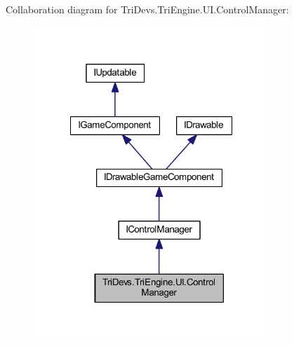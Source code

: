 Collaboration diagram for Tri\-Devs.\-Tri\-Engine.\-U\-I.\-Control\-Manager\-:
\nopagebreak
\begin{figure}[H]
\begin{center}
\leavevmode
\includegraphics[width=251pt]{class_tri_devs_1_1_tri_engine_1_1_u_i_1_1_control_manager__coll__graph}
\end{center}
\end{figure}
